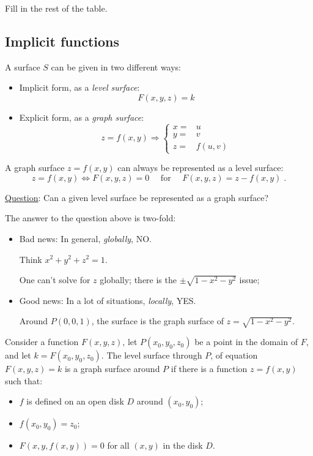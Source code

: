 Fill in the rest of the table.


\subsection{Implicit functions}

A surface $S$ can be given in two different ways:

\begin{itemize}
  \item Implicit form, as a \emph{level surface}:
  $$F(x,y,z) = k$$
  \item  Explicit form, as a \emph{graph surface}:
  $$z=f(x,y) \Longrightarrow \left\{ \begin{array}{ll}
    x = & u \\
    y = & v \\
    z = & f(u,v)
  \end{array} \right.$$
\end{itemize}

A graph surface $z=f(x,y)$ can always be represented as a level surface:
%
$$z=f(x,y) \Longleftrightarrow F(x,y,z) =0 \quad \text{ for } \quad F(x,y,z) = z-f(x,y)\; .$$

\underline{Question}: Can a given level surface be represented as a graph surface?

The answer to the question above is two-fold:

\begin{itemize}
  \item Bad news: In general, \emph{globally}, NO.

  \noindent Think $x^2+y^2+z^2= 1$.

  One can't solve for $z$ globally; there is the $\pm\sqrt{1-x^2-y^2}$ issue;
  \item Good news: In a lot of situations, \emph{locally}, YES.

  \noindent Around $P(0,0,1)$, the surface is the graph surface of $z = \sqrt{1-x^2-y^2}$.
\end{itemize}

Consider a function $F(x,y,z)$, let $P(x_0,y_0,z_0)$ be a point in the domain of $F$, and let $k=F(x_0,y_0,z_0)$. The level surface through $P$, of equation $F(x,y,z) = k$ is a graph surface around $P$ if there is a function $z=f(x,y)$ such that:
%
\begin{itemize}
  \item $f$ is defined on an open disk $D$ around $(x_0,y_0)$;
  \item $f(x_0,y_0) = z_0$;
  \item $F(x,y,f(x,y)) = 0$ for all $(x,y)$ in the disk $D$.
\end{itemize}

